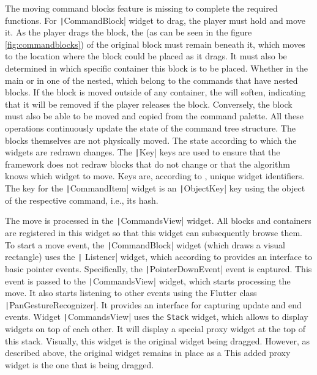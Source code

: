 The moving command blocks feature is missing to complete the required functions.
For \texttt|CommandBlock| widget to drag, the player must hold and move it.
As the player drags the block, the  (as can be seen in the figure \ref{fig:commandblocks}) of the original block must remain beneath it, which moves to the location where the block could be placed as it drags.
It must also be determined in which specific container this block is to be placed.
Whether in the main or in one of the nested, which belong to the commands that have nested blocks.
If the block is moved outside of any container, the  will soften, indicating that it will be removed if the player releases the block.
Conversely, the block must also be able to be moved and copied from the command palette.
All these operations continuously update the state of the command tree structure.
The blocks themselves are not physically moved.
The state according to which the widgets are redrawn changes.
The \texttt|Key| keys are used to ensure that the framework does not redraw blocks that do not change or that the algorithm knows which widget to move.
Keys are, according to \cite{a2022_material}, unique widget identifiers.
The key for the \texttt|CommandItem| widget is an \texttt|ObjectKey| key using the object of the respective command, i.e., its hash.

The move is processed in the \texttt|CommandsView| widget.
All blocks and containers are registered in this widget so that this widget can subsequently browse them.
To start a move event, the \texttt|CommandBlock| widget (which draws a visual rectangle) uses the \texttt| Listener| widget, which according to \cite{a2022_material} provides an interface to basic pointer events.
Specifically, the \texttt|PointerDownEvent| event is captured.
This event is passed to the \texttt|CommandsView| widget, which starts processing the move.
It also starts listening to other events using the Flutter class \texttt|PanGestureRecognizer|.
It provides an interface for capturing update and end events.
Widget \texttt|CommandsView| uses the \mintinline {text}|Stack| widget, which allows to display widgets on top of each other.
It will display a special proxy widget at the top of this stack.
Visually, this widget is the original widget being dragged.
However, as described above, the original widget remains in place as a 
This added proxy widget is the one that is being dragged.

